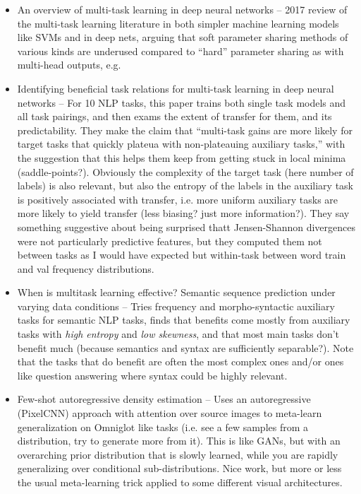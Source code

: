 \documentclass[11pt]{article}
\begin{document}
\begin{itemize}
\item An overview of multi-task learning in deep neural networks -- 2017 review of the multi-task learning literature in both simpler machine learning models like SVMs and in deep nets, arguing that soft parameter sharing methods of various kinds are underused compared to ``hard'' parameter sharing as with multi-head outputs, e.g.\citep{Ruder2017} 
\item Identifying beneficial task relations for multi-task learning in deep neural networks -- For 10 NLP tasks, this paper trains both single task models and all task pairings, and then exams the extent of transfer for them, and its predictability. They make the claim that ``multi-task gains are more likely for target tasks that quickly plateua with non-plateauing auxiliary tasks,'' with the suggestion that this helps them keep from getting stuck in local minima (saddle-points?). Obviously the complexity of the target task (here number of labels) is also relevant, but also the entropy of the labels in the auxiliary task is positively associated with transfer, i.e. more uniform auxiliary tasks are more likely to yield transfer (less biasing? just more information?). They say something suggestive about being surprised thatt Jensen-Shannon divergences were not particularly predictive features, but they computed them not between tasks as I would have expected but within-task between word train and val frequency distributions.  \citep{Bingel2017}
\item When is multitask learning effective? Semantic sequence prediction under varying data conditions -- Tries frequency and morpho-syntactic auxiliary tasks for semantic NLP tasks, finds that benefits come mostly from auxiliary tasks with \emph{high entropy} and \emph{low skewness}, and that most main tasks don't benefit much (because semantics and syntax are sufficiently separable?). Note that the tasks that do benefit are often the most complex ones and/or ones like question answering where syntax could be highly relevant. \citep{Alonso2017} 
\item Few-shot autoregressive density estimation -- Uses an autoregressive (PixelCNN) approach with attention over source images to meta-learn generalization on Omniglot like tasks (i.e. see a few samples from a distribution, try to generate more from it). This is like GANs, but with an overarching prior distribution that is slowly learned, while you are rapidly generalizing over conditional sub-distributions. Nice work, but more or less the usual meta-learning trick applied to some different visual architectures. \citep{Reed2018}

\end{itemize}
\end{document}
